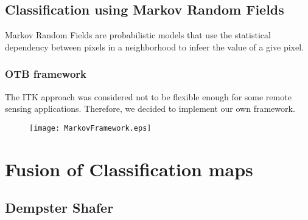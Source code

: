 \subsection{Classification using Markov Random Fields}
\label{sec:MarkovRandomField}

Markov Random Fields are probabilistic models that use the statistical
dependency between
pixels in a neighborhood to infeer the value of a give pixel.

\subsubsection{OTB framework}
\label{sec:MarkovRandomFieldOTB}
The ITK approach was considered not to be flexible enough for some
remote sensing applications. Therefore, we decided to implement our
own framework.

\begin{figure}[th]
  \centering
  \texttt{[image: MarkovFramework.eps]}
  \label{fig:markovFramework}
\end{figure}

\ifitkFullVersion

\fi

\ifitkFullVersion

\fi

\ifitkFullVersion

\fi

\ifitkFullVersion

\fi

\section{Fusion of Classification maps}

\subsection{Dempster Shafer}

